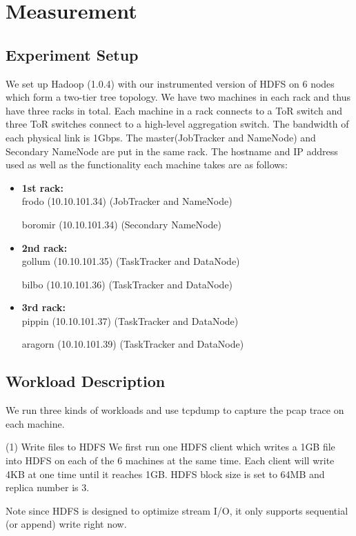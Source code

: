 \section{Measurement}
\label{section:measurement}


\subsection{\bf Experiment Setup}
We set up Hadoop (1.0.4) with our instrumented version of HDFS on 6 nodes which form a two-tier tree topology. We have two machines in each rack and thus have three racks in total. Each machine in a rack connects to a ToR switch and three ToR switches connect to a high-level aggregation switch. The bandwidth of each physical link is 1Gbps. The master(JobTracker and NameNode) and Secondary NameNode are put in the same rack. The hostname and IP address used as well as the functionality each machine takes are as follows:
\begin{itemize}
\item {\bf 1st rack:}
\\
frodo (10.10.101.34) (JobTracker and NameNode)

boromir (10.10.101.34) (Secondary NameNode)

\item {\bf 2nd rack:}
\\
gollum (10.10.101.35) (TaskTracker and DataNode)

bilbo (10.10.101.36)	(TaskTracker and DataNode)

\item {\bf 3rd rack:}
\\
pippin (10.10.101.37)	(TaskTracker and DataNode)

aragorn (10.10.101.39)	(TaskTracker and DataNode)
\end{itemize}

\subsection{\bf Workload Description}
We run three kinds of workloads and use tcpdump to capture the pcap trace on each machine.

(1) Write files to HDFS
We first run one HDFS client which writes a 1GB file into HDFS on each of the 6 machines at the same time. Each client will write 4KB at one time until it reaches 1GB. HDFS block size is set to 64MB and replica number is 3.

Note since HDFS is designed to optimize stream I/O, it only supports sequential (or append) write right now.

